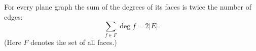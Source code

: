 

\setcounter{section}{3}
\setcounter{subsection}{2}
\setcounter{dfn}{5}

\begin{thm}
\label{thm:DualHandshake}
For every plane graph the sum of the degrees of its faces is twice the number of edges:
\[
\sum_{f \in F} \deg f = 2 |E|.
\]
(Here $F$ denotes the set of all faces.)
\end{thm}


